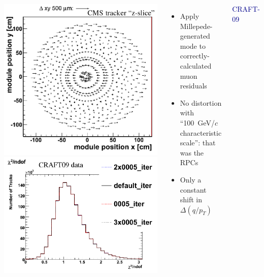 \documentclass[compress]{beamer}
\begin{document}
\begin{frame}
\begin{columns}

\includegraphics[width=0.5\linewidth]{stoye_deformation.png}
\includegraphics[width=0.5\linewidth]{chi2_invariance.png}

\begin{itemize}
\item Apply Millepede-generated mode to correctly-calculated muon residuals

\item No distortion with ``100~GeV/$c$ characteristic scale'': that was the RPCs

\item Only a constant shift in $\Delta(q/p_T)$
\end{itemize}

\hfill \textcolor{darkblue}{\scriptsize CRAFT-09}
\end{columns}
\end{frame}
\end{document}
